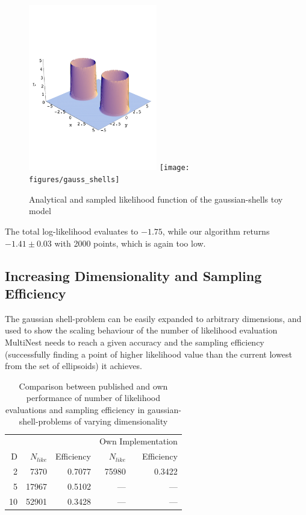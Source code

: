 \documentclass{article}
\begin{document}
\begin{figure}\label{gauss-shell}
\includegraphics[width=0.5\textwidth]{figures/gauss_shells_analytic}
\texttt{[image: figures/gauss\_shells]}
\caption{Analytical and sampled likelihood function of the gaussian-shells toy model}
\end{figure}

The total log-likelihood evaluates to $-1.75$, while our algorithm returns $-1.41\pm 0.03$  with 2000 points, which is again too low.

\subsection{Increasing Dimensionality and Sampling Efficiency}
The gaussian shell-problem can be easily expanded to arbitrary dimensions, and used to show the scaling behaviour of the number of likelihood evaluation MultiNest needs to reach a given accuracy and the sampling efficiency (successfully finding a point of higher likelihood value than the current lowest from the set of ellipsoids) it achieves.
\begin{table}\label{tab:NlikeEff}
\centering
\begin{tabular}{rrrrr}
\hline
&\multicolumn{2}{c}{\cite{2009MNRAS.398.1601F}} &\multicolumn{2}{c}{Own Implementation} \\
D&$N_{like}$ & Efficiency & $N_{like}$ & Efficiency \\ \hline
 2 &  7370 & 0.7077 & 75980 & 0.3422 \\
 5 & 17967 & 0.5102 &  ---  &  ---   \\
10 & 52901 & 0.3428 &  ---  &  ---   \\ \hline
\end{tabular}
\caption{Comparison between published and own performance of number of likelihood evaluations and sampling efficiency in gaussian-shell-problems of varying dimensionality}
\end{table}
\end{document}
